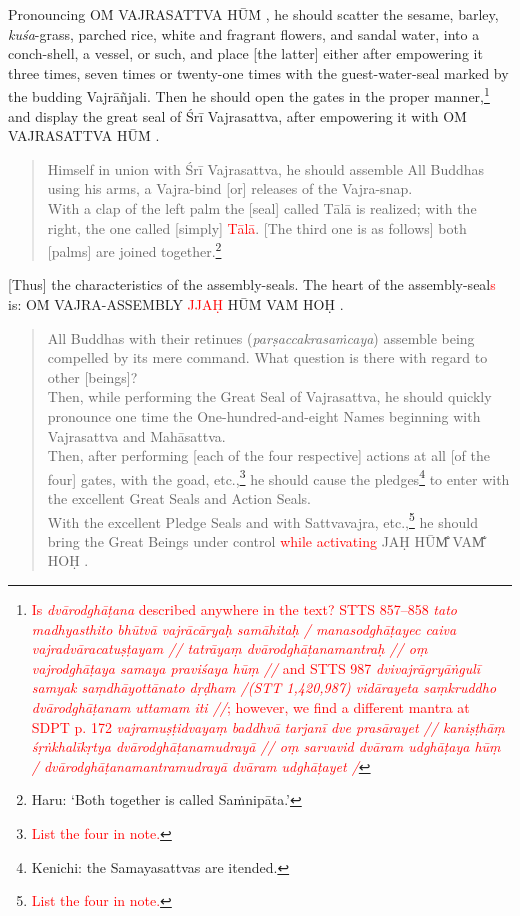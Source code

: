 \documentclass[11pt]{book}
\makeatletter
\def\fakesc#1{%
  \begingroup%
  \xdef\fake@name{\csname\curr@fontshape/\f@size\endcsname}%
  \fontsize{1.3\fontdimen8\fake@name}{\baselineskip}\selectfont%
  \uppercase{#1}%
  \endgroup%
}
\newcommand{\mantra}[1]{\fakesc{#1}}
\newcommand{\red}[1]{\textcolor{red}{#1}}
\newcommand{\skt}[1]{\emph{#1}}
\makeatother
\begin{document}
Pronouncing \mantra{oṁ vajrasattva hūṁ}, he should scatter the sesame, barley, \skt{kuśa}-grass, parched rice, white and fragrant flowers, and sandal water, into a conch-shell, a vessel, or such, and place [the latter] either after empowering it three times, seven times or twenty-one times with the guest-water-seal marked by the budding Vajrāñjali. Then he should open the gates in the proper manner,\footnote{\red{Is \skt{dvārodghāṭana} described anywhere in the text? 
STTS 857–858 \skt{tato madhyasthito bhūtvā vajrācāryaḥ samāhitaḥ / manasodghāṭayec caiva vajradvāracatuṣṭayam // tatrāyaṃ dvārodghāṭanamantraḥ // oṃ vajrodghāṭaya samaya praviśaya hūṃ //} and STTS 987 \skt{dvivajrāgryāṅgulī samyak saṃdhāyottānato dṛḍham /(STT 1,420,987)
vidārayeta saṃkruddho dvārodghāṭanam uttamam iti //};
however, we find a different mantra at SDPT p. 172 \skt{vajramuṣṭidvayaṃ baddhvā tarjanī dve prasārayet // kaniṣṭhāṃ śṛṅkhalīkṛtya dvārodghāṭanamudrayā //
oṃ sarvavid dvāram udghāṭaya hūṃ / dvārodghāṭanamantramudrayā dvāram udghāṭayet /}}} and display the great seal of Śrī Vajrasattva, after empowering it with \mantra{oṁ vajrasattva hūṁ}.


\begin{verse}
Himself in union with Śrī Vajrasattva, he should assemble All Buddhas using his arms, a Vajra-bind [or] releases of the Vajra-snap.\\
With a clap of the left palm the [seal] called Tālā is realized; with the right, the one called [simply] \red{Tālā}. [The third one is as follows] both [palms] are joined together.\footnote{Haru: `Both together is called Saṁnipāta.'}
\end{verse}

[Thus] the characteristics of the assembly-seals. The heart of the assembly-seal\red{s} is: \mantra{oṁ Vajra-Assembly \red{jjaḥ} hūṁ vaṁ hoḥ}.

\begin{verse}
All Buddhas with their retinues (\skt{parṣaccakrasaṁcaya}) assemble being compelled by its mere command. What question is there with regard to other [beings]?\\
Then, while performing the Great Seal of Vajrasattva, he should quickly pronounce one time the One-hundred-and-eight Names beginning with Vajrasattva and Mahāsattva.\\
Then, after performing [each of the four respective] actions at all [of the four] gates, with the goad, etc.,\footnote{\red{List the four in note.}} he should cause the pledges\footnote{Kenichi: the Samayasattvas are itended.} to enter with the excellent Great Seals and Action Seals.\\
With the excellent Pledge Seals and with Sattvavajra, etc.,\footnote{\red{List the four in note.}} he should bring the Great Beings under control \red{while activating} \mantra{jaḥ hūm̐ vam̐ hoḥ}.
\end{verse}
\end{document}

